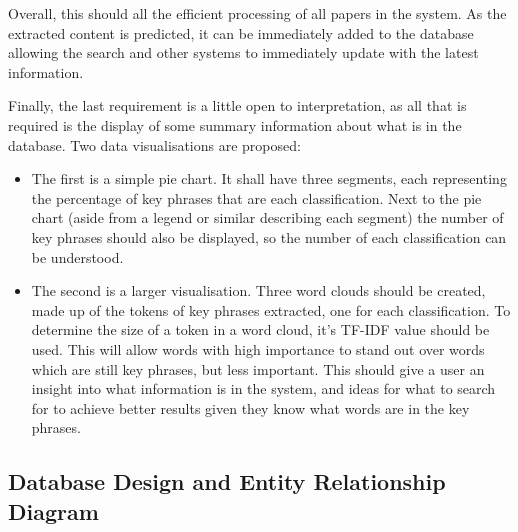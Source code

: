 Overall, this should all the efficient processing of all papers in the system. As the extracted content is predicted, it can be immediately added to the database allowing the search and other systems to immediately update with the latest information.

Finally, the last requirement is a little open to interpretation, as all that is required is the display of some summary information about what is in the database. Two data visualisations are proposed:
\begin{itemize}
	\item The first is a simple pie chart. It shall have three segments, each representing the percentage of key phrases that are each classification. Next to the pie chart (aside from a legend or similar describing each segment) the number of key phrases should also be displayed, so the number of each classification can be understood.
	\item The second is a larger visualisation. Three word clouds should be created, made up of the tokens of key phrases extracted, one for each classification. To determine the size of a token in a word cloud, it's TF-IDF value should be used. This will allow words with high importance to stand out over words which are still key phrases, but less important. This should give a user an insight into what information is in the system, and ideas for what to search for to achieve better results given they know what words are in the key phrases.
\end{itemize}

\subsection*{Database Design and Entity Relationship Diagram}

